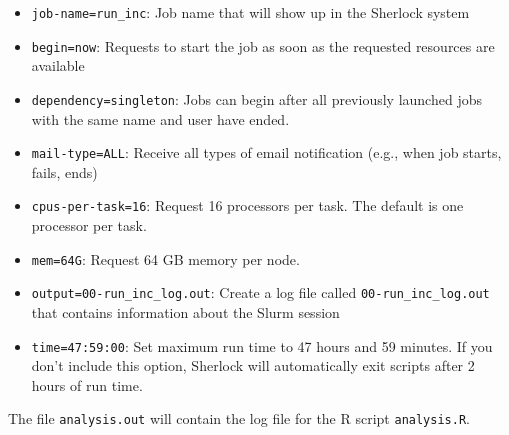 \documentclass[
]{book}
\newenvironment{Shaded}{\begin{snugshade}}{\end{snugshade}}
\newcommand{\AttributeTok}[1]{\textcolor[rgb]{0.77,0.63,0.00}{#1}}
\newcommand{\BuiltInTok}[1]{#1}
\newcommand{\CommentTok}[1]{\textcolor[rgb]{0.56,0.35,0.01}{\textit{#1}}}
\newcommand{\ExtensionTok}[1]{#1}
\newcommand{\NormalTok}[1]{#1}
\newcommand{\VariableTok}[1]{\textcolor[rgb]{0.00,0.00,0.00}{#1}}
\providecommand{\tightlist}{%
  \setlength{\itemsep}{0pt}\setlength{\parskip}{0pt}}
\begin{document}
\begin{itemize}
\tightlist
\item
  \texttt{job-name=run\_inc}: Job name that will show up in the Sherlock system
\item
  \texttt{begin=now}: Requests to start the job as soon as the requested resources are available
\item
  \texttt{dependency=singleton}: Jobs can begin after all previously launched jobs with the same name and user have ended.
\item
  \texttt{mail-type=ALL}: Receive all types of email notification (e.g., when job starts, fails, ends)
\item
  \texttt{cpus-per-task=16}: Request 16 processors per task. The default is one processor per task.
\item
  \texttt{mem=64G}: Request 64 GB memory per node.
\item
  \texttt{output=00-run\_inc\_log.out}: Create a log file called \texttt{00-run\_inc\_log.out} that contains information about the Slurm session
\item
  \texttt{time=47:59:00}: Set maximum run time to 47 hours and 59 minutes. If you don't include this option, Sherlock will automatically exit scripts after 2 hours of run time.
\end{itemize}

The file \texttt{analysis.out} will contain the log file for the R script \texttt{analysis.R}.

\begin{Shaded}
\end{Shaded}
\end{document}

